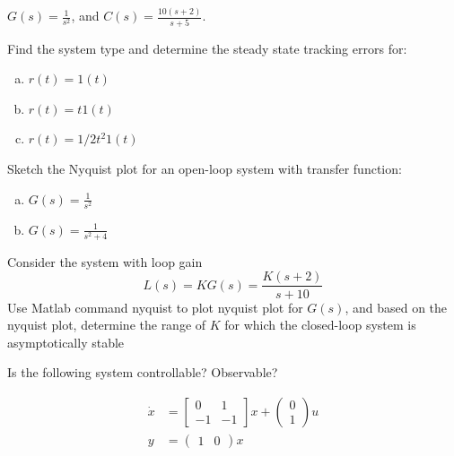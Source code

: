 \documentclass[11pt]{article}
\begin{document}
$G(s) = \frac{1}{s^2}$, and $C(s) = \frac{10(s+2)}{s+5}$.

Find the system type and determine the steady state tracking errors for:

\begin{enumerate}[a)]
    \item $r(t) = 1(t)$
    \item $r(t) = t1(t)$
    \item $r(t) = 1/2 t^2 1(t)$
\end{enumerate}

\soln




Sketch the Nyquist plot for an open-loop system with transfer function:
\begin{enumerate}[a)]
    \item $G(s) = \frac{1}{s^2}$
    \item $G(s) = \frac{1}{s^2 + 4}$
\end{enumerate}

\soln







Consider the system with loop gain
$$
L(s) = KG(s) = \frac{K(s+2)}{s+10}
$$
Use Matlab command nyquist to plot nyquist plot for $G(s)$, and based
on the nyquist plot, determine the range of $K$ for which the closed-loop system is asymptotically stable
\soln




Is the following system controllable? Observable?

\begin{align*}
    \dot{x} &= \begin{bmatrix}
        0 & 1 \\ -1 & -1
    \end{bmatrix} x + \begin{pmatrix}
        0 \\ 1
    \end{pmatrix} u \\
    y &= \begin{pmatrix}
        1 & 0
    \end{pmatrix} x
\end{align*}

\soln
\end{document}
